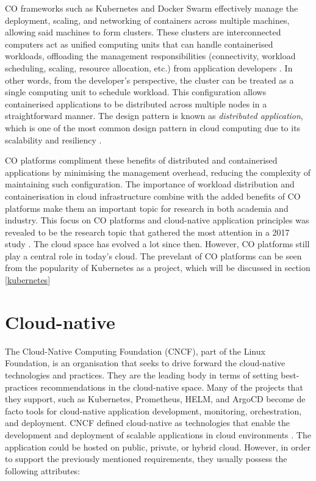CO frameworks such as Kubernetes and Docker Swarm effectively manage the deployment, scaling, and networking of containers across multiple machines, allowing said machines to form clusters. These clusters are interconnected computers act as unified computing units that can handle containerised workloads, offloading the management responsibilities (connectivity, workload scheduling, scaling, resource allocation, etc.) from application developers \cite{Nodes, UsingMinikubeCreate}. In other words, from the developer's perspective, the cluster can be treated as a single computing unit to schedule workload. This configuration allows containerised applications to be distributed across multiple nodes in a straightforward manner. The design pattern is known as \textit{distributed application}, which is one of the most common design pattern in cloud computing due to its scalability and resiliency \cite{fehling2014cloud,kratzkeUnderstandingCloudnativeApplications2017}.

CO platforms compliment these benefits of distributed and containerised applications by minimising the management overhead, reducing the complexity of maintaining such configuration. The importance of workload distribution and containerisation in cloud infrastructure combine with the added benefits of CO platforms make them an important topic for research in both academia and industry. This focus on CO platforms and cloud-native application principles was revealed to be the research topic that gathered the most attention in a 2017 study \cite{kratzkeUnderstandingCloudnativeApplications2017}. The cloud space has evolved a lot since then. However, CO platforms still play a central role in today's cloud. The prevelant of CO platforms can be seen from the popularity of Kubernetes as a project, which will be discussed in section \ref{kubernetes}

\section{Cloud-native}
The Cloud-Native Computing Foundation (CNCF), part of the Linux Foundation, is an organisation that seeks to drive forward the cloud-native technologies and practices. They are the leading body in terms of setting best-practices recommendations in the cloud-native space. Many of the projects that they support, such as Kubernetes, Prometheus, HELM, and ArgoCD become de facto tools for cloud-native application development, monitoring, orchestration, and deployment. CNCF defined cloud-native as technologies that enable the development and deployment of scalable applications in cloud environments \cite{cloudnativecomputingfoundationWhoWeAre}. The application could be hosted on public, private, or hybrid cloud. However, in order to support the previously mentioned requirements, they usually possess the following attributes:

